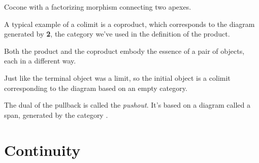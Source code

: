 \begin{figure}[H]
\centering
{}
\end{figure}

\noindent
Cocone with a factorizing morphism  connecting two apexes.

A typical example of a colimit is a coproduct, which corresponds to the
diagram generated by \textbf{2}, the category we've used in the
definition of the product.

\begin{figure}[H]
\centering
{}
\end{figure}

\noindent
Both the product and the coproduct embody the essence of a pair of
objects, each in a different way.

Just like the terminal object was a limit, so the initial object is a
colimit corresponding to the diagram based on an empty category.

The dual of the pullback is called the \emph{pushout}. It's based on a
diagram called a span, generated by the category
.

\section{Continuity}\label{continuity}

